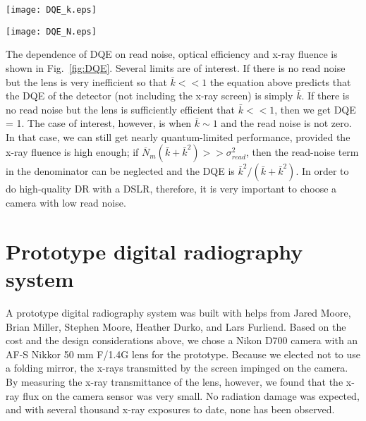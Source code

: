 \begin{figure*}[h]
	\begin{minipage}[b]{0.45\linewidth}
		\centering
		\texttt{[image: DQE\_k.eps]}
		\subcaption{}
	\end{minipage}
	\hspace{0.2cm}
	\begin{minipage}[b]{0.45\linewidth}
		\centering
		\texttt{[image: DQE\_N.eps]}
		\subcaption{}
	\end{minipage}						
\caption{DQE for detection of a uniform disk lesion on a flat background. (a): DQE vs. x-ray fluence (absorbed photons per 100 $\mathrm{\mu m}$ pixel) for fixed optical efficiency (2 photoelectrons per x-ray photon) and difference camera read-noise variances. (b): DQE vs. optical efficiency for different x-ray fluences and noise levels. Typical $\overline{N}_m$ in DR is 500 photons per pixel, and typical $\sigma_{read}^2$ in a modern DSLR is about 25 photons per pixel(5 electrons RMS).}
\label{fig:DQE}
\end{figure*}

The dependence of DQE on read noise, optical efficiency and x-ray fluence is shown in Fig.~\ref{fig:DQE}. Several limits are of interest. If there is no read noise but the lens is very inefficient so that $\bar{k} << 1$ the equation above predicts that the DQE of the detector (not including the x-ray screen) is simply $\bar{k}$.  If there is no read noise but the lens is sufficiently efficient that $\bar{k} << 1$, then we get DQE = 1. The case of interest, however, is when $\bar{k} \sim 1$ and the read noise is not zero. In that case, we can still get nearly quantum-limited performance, provided the x-ray fluence is high enough; if $\overline{N}_m(\bar{k}+\bar{k}^2) >> \sigma_{read}^2$, then the read-noise term in the denominator can be neglected and the DQE is $\bar{k}^2/(\bar{k}+\bar{k}^2)$. In order to do high-quality DR with a DSLR, therefore, it is very important to choose a camera with low read noise.

\section{Prototype digital radiography system}
A prototype digital radiography system was built with helps from Jared Moore, Brian Miller, Stephen Moore, Heather Durko, and Lars Furliend.  Based on the cost and the design considerations above, we chose a Nikon D700 camera with an AF-S Nikkor 50 mm F/1.4G lens for the prototype.  Because we elected not to use a folding mirror, the x-rays transmitted by the screen impinged on the camera. By measuring the x-ray transmittance of the lens, however, we found that the x-ray flux on the camera sensor was very small. No radiation damage was expected, and with several thousand x-ray exposures to date, none has been observed.

